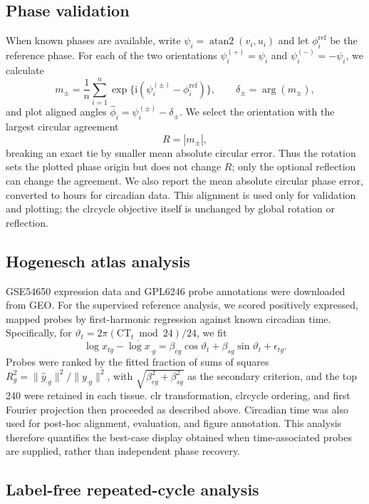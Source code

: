 \documentclass[10pt,twocolumn]{article}
\begin{document}
\subsection{Phase validation}

When known phases are available, write \(\psi_i=\operatorname{atan2}(v_i,u_i)\)
and let \(\phi_i^{\mathrm{ref}}\) be the reference phase. For each of the two
orientations \(\psi_i^{(+)}=\psi_i\) and \(\psi_i^{(-)}=-\psi_i\), we calculate
\[
m_{\pm}=\frac{1}{n}\sum_{i=1}^n
\exp\{\mathrm{i}(\psi_i^{(\pm)}-\phi_i^{\mathrm{ref}})\},
\qquad \delta_{\pm}=\arg(m_{\pm}),
\]
and plot aligned angles \(\hat\phi_i=\psi_i^{(\pm)}-\delta_{\pm}\). We select
the orientation with the largest circular agreement
\[
R=|m_{\pm}|,
\]
breaking an exact tie by smaller mean absolute circular error. Thus the rotation
sets the plotted phase origin but does not change \(R\); only the optional
reflection can change the agreement.
We also report the mean absolute circular phase error, converted to hours for
circadian data. This alignment is used only for validation and plotting; the clrcycle
objective itself is unchanged by global rotation or reflection.

\subsection{Hogenesch atlas analysis}

GSE54650 expression data and GPL6246 probe annotations were downloaded from GEO.
For the supervised reference analysis, we scored positively expressed, mapped
probes by first-harmonic regression against known circadian time. Specifically,
for \(\vartheta_t=2\pi(\mathrm{CT}_t\bmod 24)/24\), we fit
\[
\log x_{tg}-\overline{\log x}_{\cdot g}
= \beta_{cg}\cos\vartheta_t+\beta_{sg}\sin\vartheta_t+\epsilon_{tg}.
\]
Probes were ranked by the fitted fraction of sums of squares
\(R_g^2=\|\hat y_{\cdot g}\|^2/\|y_{\cdot g}\|^2\), with
\(\sqrt{\beta_{cg}^2+\beta_{sg}^2}\) as the secondary criterion, and the top
240 were retained in each tissue. clr transformation, clrcycle ordering, and first
Fourier projection then proceeded as described above. Circadian time was also
used for post-hoc alignment, evaluation, and figure annotation. This analysis
therefore quantifies the best-case display obtained when time-associated probes
are supplied, rather than independent phase recovery.

\subsection{Label-free repeated-cycle analysis}
\end{document}
